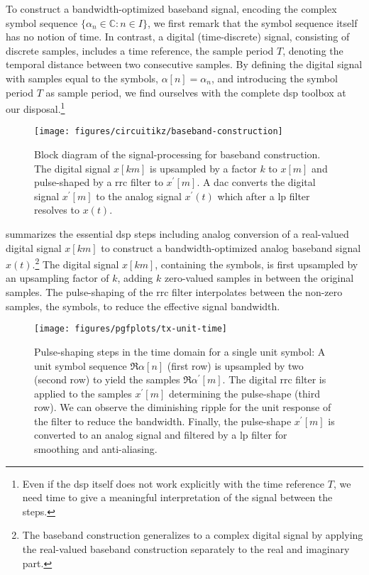 To construct a bandwidth-optimized baseband signal, encoding the complex symbol sequence $\{\alpha_n\in\mathbb{C}\colon n\in I\}$, we first remark that the symbol sequence itself has no notion of time.
In contrast, a digital (time-discrete) signal, consisting of discrete samples, includes a time reference, the sample period $T$, denoting the temporal distance between two consecutive samples.
By defining the digital signal with samples equal to the symbols, $\alpha[n]=\alpha_n$, and introducing the symbol period $T$ as sample period, we find ourselves with the complete \gls{dsp} toolbox at our disposal.\footnote{Even if the \gls{dsp} itself does not work explicitly with the time reference $T$, we need time to give a meaningful interpretation of the signal between the steps.}
\begin{figure}[htb]
	\centering
	\texttt{[image: figures/circuitikz/baseband-construction]}
	\caption{Block diagram of the signal-processing for baseband construction. The digital signal $x[km]$ is upsampled by a factor $k$ to $x[m]$ and pulse-shaped by a \gls{rrc} filter to $x^\prime[m]$. A \gls{dac} converts the digital signal $x^\prime[m]$ to the analog signal $x^\prime(t)$ which after a \gls{lp} filter resolves to $x(t)$.}\label{fig:baseband_construction}
\end{figure}
 summarizes the essential \gls{dsp} steps including analog conversion of a real-valued digital signal $x[km]$ to construct a bandwidth-optimized analog baseband signal $x(t)$.\footnote{The baseband construction generalizes to a complex digital signal by applying the real-valued baseband construction separately to the real and imaginary part.}
The digital signal $x[km]$, containing the symbols, is first upsampled by an upsampling factor of $k$, adding $k$ zero-valued samples in between the original samples.
The pulse-shaping of the \gls{rrc} filter interpolates between the non-zero samples, the symbols, to reduce the effective signal bandwidth.
\begin{figure}[htb]
	\centering
	\texttt{[image: figures/pgfplots/tx-unit-time]}
	\caption{Pulse-shaping steps in the time domain for a single unit symbol: A unit symbol sequence $\Re\alpha[n]$ (first row) is upsampled by two (second row) to yield the samples $\Re\alpha^\prime[m]$. The digital \gls{rrc} filter is applied to the samples $x^\prime[m]$ determining the pulse-shape (third row). We can observe the diminishing ripple for the unit response of the filter to reduce the bandwidth. Finally, the pulse-shape $x^\prime[m]$ is converted to an analog signal and filtered by a \gls{lp} filter for smoothing and anti-aliasing.}\label{fig:baseband_construction_unit_pulse}
\end{figure}

